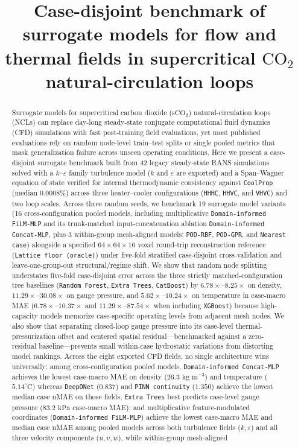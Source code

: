 \documentclass[11pt]{article}
\title{\textbf{Case-disjoint benchmark of surrogate models for flow and thermal fields in supercritical $\mathrm{CO}_2$ natural-circulation loops}}
\author{}
\date{}
\begin{document}
\maketitle

\begin{abstract}
Surrogate models for supercritical carbon dioxide ($\mathrm{sCO}_2$) natural-circulation loops (NCLs) can replace day-long steady-state conjugate computational fluid dynamics (CFD) simulations with fast post-training field evaluations, yet most published evaluations rely on random node-level train--test splits or single pooled metrics that mask generalization failure across unseen operating conditions. Here we present a case-disjoint surrogate benchmark built from 42 legacy steady-state RANS simulations solved with a $k$--$\varepsilon$ family turbulence model ($k$ and $\varepsilon$ are exported) and a Span--Wagner equation of state verified for internal thermodynamic consistency against \texttt{CoolProp} (median $0.0008\%$) across three heater--cooler configurations (\texttt{HHHC}, \texttt{HHVC}, and \texttt{VHVC}) and two loop scales. Across three random seeds, we benchmark 19 surrogate model variants (16 cross-configuration pooled models, including multiplicative \texttt{Domain-informed FiLM-MLP} and its trunk-matched input-concatenation ablation \texttt{Domain-informed Concat-MLP}, plus 3 within-group mesh-aligned models: \texttt{POD-RBF}, \texttt{POD-GPR}, and \texttt{Nearest case}) alongside a specified $64\times 64\times 16$ voxel round-trip reconstruction reference (\texttt{Lattice floor (oracle)}) under five-fold stratified case-disjoint cross-validation and leave-one-group-out structural/regime shift. We show that random node splitting understates five-fold case-disjoint error across the three strictly matched-configuration tree baselines (\texttt{Random Forest}, \texttt{Extra Trees}, \texttt{CatBoost}) by $6.78\times\text{--}8.25\times$ on density, $11.29\times\text{--}30.08\times$ on gauge pressure, and $5.62\times\text{--}10.24\times$ on temperature in case-macro MAE ($6.78\times\text{--}10.37\times$ and $11.29\times\text{--}87.54\times$ when including \texttt{XGBoost}) because high-capacity models memorize case-specific operating levels from adjacent mesh nodes. We also show that separating closed-loop gauge pressure into its case-level thermal-pressurization offset and centered spatial residual---benchmarked against a zero-residual baseline---prevents small within-case hydrostatic variations from distorting model rankings. Across the eight exported CFD fields, no single architecture wins universally: among cross-configuration pooled models, \texttt{Domain-informed Concat-MLP} achieves the lowest case-macro MAE on density ($26.3\text{ kg m}^{-3}$) and temperature ($5.14^\circ\text{C}$) whereas \texttt{DeepONet} ($0.837$) and \texttt{PINN continuity} ($1.350$) achieve the lowest median case nMAE on those fields; \texttt{Extra Trees} best predicts case-level gauge pressure ($83.2\text{ kPa}$ case-macro MAE); and multiplicative feature-modulated coordinates (\texttt{Domain-informed FiLM-MLP}) achieve the lowest case-macro MAE and median case nMAE among pooled models across both turbulence fields ($k, \varepsilon$) and all three velocity components ($u, v, w$), while within-group mesh-aligned 
\end{abstract}
\end{document}
